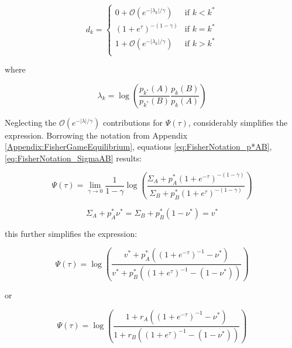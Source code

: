 \documentclass{article}
\theoremstyle{definition}
\begin{document}
\begin{equation}
    d_k = 
    \begin{cases}
        0 + \mathcal{O}(e^{-|\lambda_k|/\gamma}) & \text{if } k < k^* \\
        \left (1 + e^{\tau} \right )^{-(1-\gamma)} & \text{if } k=k^* \\
        1 + \mathcal{O}(e^{-|\lambda_k|/\gamma}) & \text{if } k > k^* \\
\end{cases}
\end{equation}

where

\begin{equation}
    \lambda_k =   \log \left( \frac{p_{k^*}(A)}{p_{k^*}(B)} \frac{p_k(B)}{p_k(A)} \right )  
\end{equation}

Neglecting the $\mathcal{O}(e^{-|\lambda|/\gamma})$ contributions for $\Psi(\tau)$, considerably simplifies the expression. Borrowing the notation from Appendix \ref{Appendix:FisherGameEquilibrium}, equations \eqref{eq:FisherNotation_p*AB}, \eqref{eq:FisherNotation_SigmaAB} results:

\begin{equation}
    \Psi(\tau) = \lim_{\gamma \to 0} \frac{1}{1-\gamma}
    \log \left (
    \frac
    {\Sigma_A + p^*_A \left (1 + e^{-\tau}\right )^{-(1-\gamma)}}
    {\Sigma_B + p^*_B \left (1 + e^{\tau} \right )^{-(1-\gamma)}}
    \right )
\end{equation}

\begin{equation}
    \Sigma_A + p^*_A \nu^* = \Sigma_B + p^*_B (1-\nu^*) = v^*
\end{equation}

this further simplifies the expression:

\begin{equation}
    \Psi(\tau) = 
    \log \left (
    \frac
    {v^* + p^*_A \left ( \left (1 + e^{-\tau}  \right )^{-1} - \nu^* \right)}
    {v^* + p^*_B \left ( \left (1 + e^{\tau}  \right )^{-1} - (1-\nu^*) \right )}
    \right )
\end{equation}

or

\begin{equation}
    \Psi(\tau) = 
    \log \left (
    \frac
    {1 + r_A \left ( \left (1 + e^{-\tau}  \right )^{-1} - \nu^* \right)}
    {1 + r_B \left ( \left (1 + e^{\tau}  \right )^{-1} - (1-\nu^*) \right )}
    \right )
\end{equation}
\end{document}
